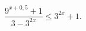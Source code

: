 \begin{ex}[type=inequality]
	\begin{condition}
		$ \dfrac{9^{x + 0,5} + 1}{3 - 3^{2x}}\leqslant3^{2x} + 1 .$
	\end{condition}
\end{ex}